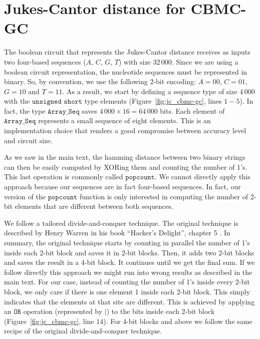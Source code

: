 \chapter{Jukes-Cantor distance for CBMC-GC}\label{appendix:appendixA}

%

The boolean circuit that represents the Jukes-Cantor distance receives as inputs two four-based sequences ($A$, $C$, $G$, $T$) with size $32\, 000$. Since we are using a boolean circuit representation, the nucleotide sequences must be represented in binary. So, by convention, we use the following 2-bit encoding: $A = 00$, $C = 01$, $G = 10$ and $T = 11$. As a result, we start by defining a sequence type of size $4\, 000$ with the $\texttt{unsigned short}$ type elements (Figure~\ref{fig:jc_cbmc-gc}, lines $1-5$). In fact, the type $\texttt{Array\_Seq}$ saves $4\, 000 \times 16 = 64\, 000$ bits. Each element of $\texttt{Array\_Seq}$ represents a small sequence of eight elements. This is an implementation choice that renders a good compromise between accuracy level and circuit size.

As we saw in the main text, the hamming distance between two binary strings can then be easily computed by XORing them and counting the number of 1’s. This last operation is commonly called $\texttt{popcount}$. We cannot directly apply this approach because our sequences are in fact four-based sequences. In fact, our version of the $\texttt{popcount}$ function is only interested in computing the number of 2-bit elements that are different between both sequences.

We follow a tailored divide-and-conquer technique. The original technique is described by Henry Warren in his book “Hacker’s Delight”, chapter 5 \citep{W12}. In summary, the original technique starts by counting in parallel the number of 1’s inside each 2-bit block and saves it in 2-bit blocks. Then, it adds two 2-bit blocks and saves the result in a 4-bit block. It continues until we get the final sum. If we follow directly this approach we might run into wrong results as described in the main text. For our case, instead of counting the number of 1’s inside every 2-bit block, we only care if there is one element 1 inside each 2-bit block. This simply indicates that the elements at that site are different. This is achieved by applying an $\texttt{OR}$ operation (represented by $\texttt{|}$) to the bits inside each 2-bit block (Figure~\ref{fig:jc_cbmc-gc}, line $14$). For 4-bit blocks and above we follow the same recipe of the original divide-and-conquer technique. 

